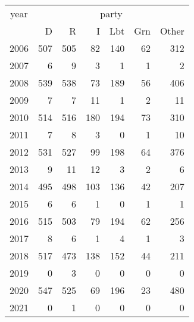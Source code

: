 \footnotesize\begin{tabular}[t]{lrrrrrr}
\toprule
\multicolumn{1}{c}{year} & \multicolumn{6}{c}{party} \\
\cmidrule(l{3pt}r{3pt}){1-1} \cmidrule(l{3pt}r{3pt}){2-7}
  & D & R & I & Lbt & Grn & Other\\
\midrule
2006 & 507 & 505 & 82 & 140 & 62 & 312\\
2007 & 6 & 9 & 3 & 1 & 1 & 2\\
2008 & 539 & 538 & 73 & 189 & 56 & 406\\
2009 & 7 & 7 & 11 & 1 & 2 & 11\\
2010 & 514 & 516 & 180 & 194 & 73 & 310\\
2011 & 7 & 8 & 3 & 0 & 1 & 10\\
2012 & 531 & 527 & 99 & 198 & 64 & 376\\
2013 & 9 & 11 & 12 & 3 & 2 & 6\\
2014 & 495 & 498 & 103 & 136 & 42 & 207\\
2015 & 6 & 6 & 1 & 0 & 1 & 1\\
2016 & 515 & 503 & 79 & 194 & 62 & 256\\
2017 & 8 & 6 & 1 & 4 & 1 & 3\\
2018 & 517 & 473 & 138 & 152 & 44 & 211\\
2019 & 0 & 3 & 0 & 0 & 0 & 0\\
2020 & 547 & 525 & 69 & 196 & 23 & 480\\
2021 & 0 & 1 & 0 & 0 & 0 & 0\\
\bottomrule
\end{tabular}
